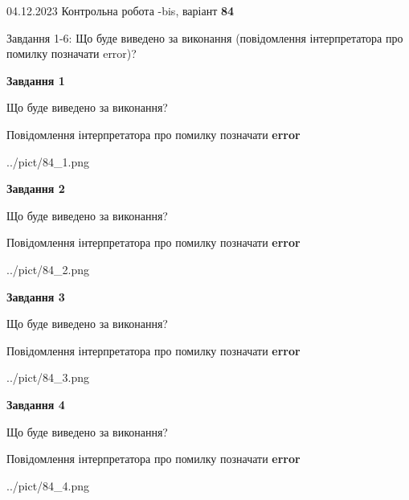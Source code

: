 \documentclass[12pt, ukrainian]{article}
\begin{document}
{{04.12.2023 Контрольна робота -bis, варіант  \No \textbf { 84 }\par}}
{

Завдання 1-6: Що буде виведено за виконання (повідомлення інтерпретатора про помилку позначати error)?


{\begin {center}\textbf{Завдання 1}\end {center}}\par
Що буде виведено за виконання? \par
Повідомлення інтерпретатора про помилку позначати \textbf{error}

\begin{center}
	{../pict/84_1.png}
\end{center}
\newpage

{\begin {center}\textbf{Завдання 2}\end {center}}\par
Що буде виведено за виконання? \par
Повідомлення інтерпретатора про помилку позначати \textbf{error}

\begin{center}
	{../pict/84_2.png}
\end{center}
\newpage

{\begin {center}\textbf{Завдання 3}\end {center}}\par
Що буде виведено за виконання? \par
Повідомлення інтерпретатора про помилку позначати \textbf{error}

\begin{center}
	{../pict/84_3.png}
\end{center}
\newpage

{\begin {center}\textbf{Завдання 4}\end {center}}\par
Що буде виведено за виконання? \par
Повідомлення інтерпретатора про помилку позначати \textbf{error}

\begin{center}
	{../pict/84_4.png}
\end{center}
\newpage

}
\end{document}
